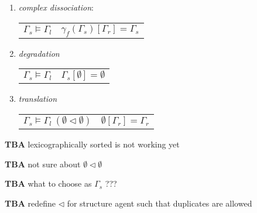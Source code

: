 \documentclass[12pt]{article}
\begin{document}
\begin{enumerate}
\item \textit{complex dissociation}:
\begin{center}
\begin{tabular}{ l l }
	$  \Gamma_s \models \Gamma_l $ & \hspace*{1 cm} $ \gamma_f(\Gamma_s)[\Gamma_r] = \Gamma_s $
\end{tabular}
\end{center}

\item \textit{degradation}
\begin{center}
\begin{tabular}{ l l }
	$ \Gamma_s \models \Gamma_l $ & \hspace*{1 cm} $ \Gamma_s[\emptyset] = \emptyset $
\end{tabular}
\end{center}

\item \textit{translation}
\begin{center}
\begin{tabular}{ l l }
	$ \Gamma_s \models \Gamma_l ~(\emptyset \lhd \emptyset) $ & \hspace*{1 cm} $ \emptyset[\Gamma_r] = \Gamma_r $
\end{tabular}
\end{center}

\end{enumerate}

\textbf{TBA} lexicographically sorted is not working yet

\textbf{TBA} not sure about $\emptyset \lhd \emptyset$

\textbf{TBA} what to choose as $\Gamma_s$ ???

\textbf{TBA} redefine $\lhd$ for structure agent such that duplicates are allowed
\end{document}
